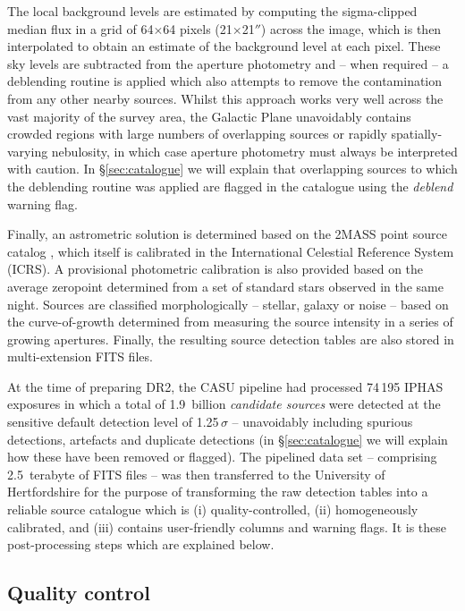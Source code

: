 \documentclass[useAMS,usenatbib]{mn2e}
\def\arcsec{$''$}
\begin{document}
The local background levels are estimated 
by computing the sigma-clipped median
flux in a grid of 64$\times$64 pixels (21$\times$21\arcsec)
across the image,
which is then interpolated to obtain an estimate 
of the background level at each pixel.
These sky levels are subtracted from the aperture photometry and
-- when required --
a deblending routine is applied which also attempts to remove
the contamination from any other nearby sources.
Whilst this approach works very well 
across the vast majority of the survey area,
the Galactic Plane unavoidably contains crowded regions 
with large numbers of overlapping sources
or rapidly spatially-varying nebulosity,
in which case aperture photometry must always be interpreted 
with caution.
In \S\ref{sec:catalogue} we will explain that overlapping
sources to which the deblending routine was applied 
are flagged in the catalogue using the \emph{deblend} warning flag.

Finally, an astrometric solution is determined
based on the 2MASS point source catalog \citep{Skrutskie2006},
which itself is calibrated 
in the International Celestial Reference System (ICRS).
A provisional photometric calibration is also provided 
based on the average zeropoint
determined from a set of standard stars observed in the same night.
Sources are classified morphologically
-- stellar, galaxy or noise --
based on the curve-of-growth determined
from measuring the source intensity in a series of growing apertures.
Finally, the resulting source detection tables are also stored 
in multi-extension FITS files.

At the time of preparing DR2,
the CASU pipeline had processed
74\,195 IPHAS exposures 
in which a total of 1.9~billion \emph{candidate sources} were detected 
at the sensitive default detection level of 1.25\,$\sigma$
-- unavoidably including spurious detections, artefacts and
duplicate detections 
(in \S\ref{sec:catalogue} we will explain
how these have been removed or flagged).
The pipelined data set -- comprising 2.5~terabyte of FITS files --
was then transferred to the University of Hertfordshire
for the purpose of transforming the raw
detection tables into a reliable source catalogue which is 
(i) quality-controlled,
(ii) homogeneously calibrated, and 
(iii) contains user-friendly columns and warning flags.
It is these post-processing steps which are explained below.


\subsection{Quality control}
\label{sec:qc}
\end{document}

